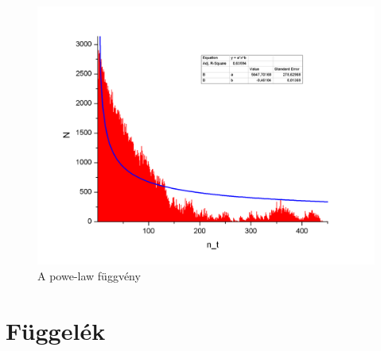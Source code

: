 \documentclass[paper=a4, fontsize=11pt]{article}
\begin{document}
\begin{figure}[H]
    \centering
    \includegraphics[width=\textwidth]{power}
    \caption{A powe-law függvény }
\end{figure}


































\newpage
\section{Függelék}
\end{document}
